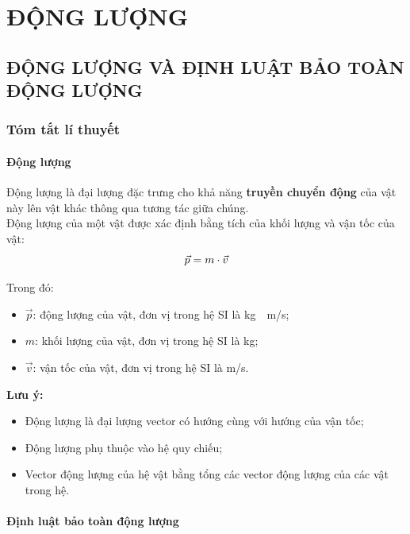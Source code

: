 \chapter{ĐỘNG LƯỢNG}
\setcounter{section}{17}
\section{ĐỘNG LƯỢNG VÀ ĐỊNH LUẬT BẢO TOÀN ĐỘNG LƯỢNG}
\subsection{Tóm tắt lí thuyết}
\begin{tomtat}
	\subsubsection{Động lượng}
	\begin{dn}
		Động lượng là đại lượng đặc trưng cho khả năng \textbf{truyền chuyển động} của vật này lên vật khác thông qua tương tác giữa chúng.\\
		Động lượng của một vật được xác định bằng tích của khối lượng và vận tốc của vật:
	\begin{equation}
		\vec{p}=m\cdot\vec{v}\\
		\label{eq:1}
	\end{equation}
		\end{dn}
	Trong đó:
	\begin{itemize}
		\item $\vec{p}$: động lượng của vật, đơn vị trong hệ SI là \si{\kilogram\cdot\meter/\second};
		\item $m$: khối lượng của vật, đơn vị trong hệ SI là \si{\kilogram};
		\item $\vec{v}$: vận tốc của vật, đơn vị trong hệ SI là \si{\meter/\second}.
	\end{itemize}
	\begin{note} \textbf{Lưu ý:}
	\begin{itemize}
		\item Động lượng là đại lượng vector có hướng cùng với hướng của vận tốc;
		\item Động lượng phụ thuộc vào hệ quy chiếu;
		\item Vector động lượng của hệ vật bằng tổng các vector động lượng của các vật trong hệ.
	\end{itemize}
	\end{note}
	\subsubsection{Định luật bảo toàn động lượng}

\end{tomtat}
